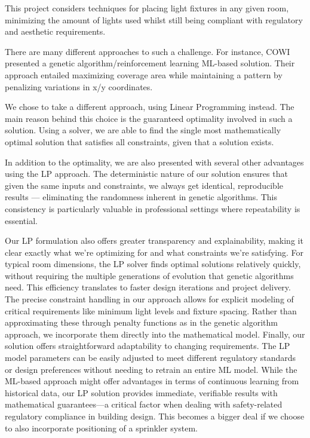 \documentclass{article}
\begin{document}
This project considers techniques for placing light fixtures in any given room, 
minimizing the amount of lights used whilst still being compliant with regulatory
and aesthetic requirements.

There are many different approaches to such a challenge. For instance, COWI presented
a genetic algorithm/reinforcement learning ML-based solution. Their approach 
entailed maximizing coverage area while maintaining a pattern by penalizing variations
in x/y coordinates. 

We chose to take a different approach, using Linear Programming instead. The main reason
behind this choice is the guaranteed optimality involved in such a solution.
Using a solver, we are able to find the single most mathematically optimal solution 
that satisfies all constraints, given that a solution exists.

In addition to the optimality, we are also presented with several other advantages 
using the LP approach. The deterministic nature of our solution ensures that given 
the same inputs and constraints, we always get identical, reproducible 
results — eliminating the randomness inherent in genetic algorithms. This 
consistency is particularly valuable in professional settings where repeatability 
is essential.

Our LP formulation also offers greater transparency and explainability, making it 
clear exactly what we're optimizing for and what constraints we're satisfying. 
For typical room dimensions, the LP solver finds optimal solutions relatively quickly, 
without requiring the multiple generations of evolution that genetic algorithms need. 
This efficiency translates to faster design iterations and project delivery.
The precise constraint handling in our approach allows for explicit modeling of 
critical requirements like minimum light levels and fixture spacing. Rather than 
approximating these through penalty functions as in the genetic algorithm approach, 
we incorporate them directly into the mathematical model.
Finally, our solution offers straightforward adaptability to changing requirements. 
The LP model parameters can be easily adjusted to meet different regulatory 
standards or design preferences without needing to retrain an entire ML model. 
While the ML-based approach might offer advantages in terms of continuous 
learning from historical data, our LP solution provides immediate, verifiable 
results with mathematical guarantees—a critical factor when dealing with 
safety-related regulatory compliance in building design. This becomes a bigger deal
if we choose to also incorporate positioning of a sprinkler system.
\end{document}
